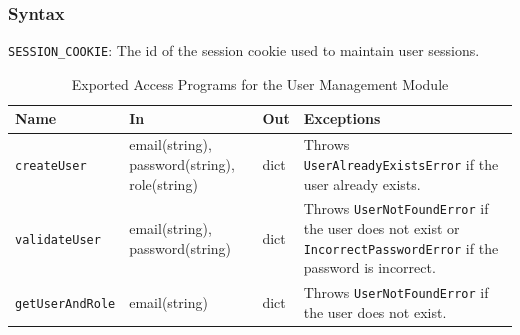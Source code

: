 \documentclass[12pt, titlepage]{article}
\begin{document}
\subsubsection{Syntax}
\begin{description}
  \item[Exported Constants and Access Programs:]
  \item 
  \texttt{SESSION\_COOKIE}: The id of the session cookie used to maintain user sessions.
  
  \begin{table}[H]
    \centering
    \begin{tabular}{p{} p{} p{}
    p{}}
    \toprule
    \textbf{Name} & \textbf{In} & \textbf{Out} & \textbf{Exceptions}\\
    \midrule
    
    \texttt{createUser} & email(string), password(string), role(string) & dict &
    Throws \texttt{UserAlreadyExistsError} if the user already exists.\\
    \midrule
    
    \texttt{validateUser} & email(string), password(string) & dict & Throws
    \texttt{UserNotFoundError} if the user does not exist or
    \texttt{IncorrectPasswordError} if the password is incorrect.\\
    \midrule

    \texttt{getUserAndRole} & email(string) & dict & Throws
    \texttt{UserNotFoundError} if the user does not exist.\\
    \bottomrule

    \end{tabular}
    \caption{Exported Access Programs for the User Management Module}
    \label{TblEAP_UM}
  \end{table}
\end{description}
\end{document}
